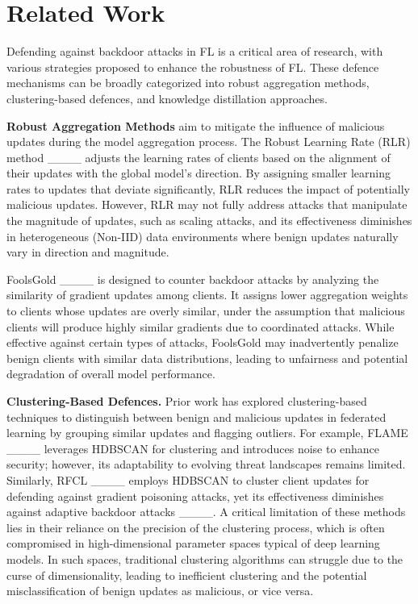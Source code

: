 \section{Related Work}
Defending against backdoor attacks in FL is a critical area of research, with various strategies proposed to enhance the robustness of FL. These defence mechanisms can be broadly categorized into robust aggregation methods, clustering-based defences, and knowledge distillation approaches.

\textbf{Robust Aggregation Methods} aim to mitigate the influence of malicious updates during the model aggregation process. The Robust Learning Rate (RLR) method ____ adjusts the learning rates of clients based on the alignment of their updates with the global model's direction. By assigning smaller learning rates to updates that deviate significantly, RLR reduces the impact of potentially malicious updates. However, RLR may not fully address attacks that manipulate the magnitude of updates, such as scaling attacks, and its effectiveness diminishes in heterogeneous (Non-IID) data environments where benign updates naturally vary in direction and magnitude. 

FoolsGold ____ is designed to counter backdoor attacks by analyzing the similarity of gradient updates among clients. It assigns lower aggregation weights to clients whose updates are overly similar, under the assumption that malicious clients will produce highly similar gradients due to coordinated attacks. While effective against certain types of attacks, FoolsGold may inadvertently penalize benign clients with similar data distributions, leading to unfairness and potential degradation of overall model performance.

\textbf{Clustering-Based Defences.} Prior work has explored clustering-based techniques to distinguish between benign and malicious updates in federated learning by grouping similar updates and flagging outliers. For example, FLAME ____ leverages HDBSCAN for clustering and introduces noise to enhance security; however, its adaptability to evolving threat landscapes remains limited. Similarly, RFCL ____ employs HDBSCAN to cluster client updates for defending against gradient poisoning attacks, yet its effectiveness diminishes against adaptive backdoor attacks ____. A critical limitation of these methods lies in their reliance on the precision of the clustering process, which is often compromised in high-dimensional parameter spaces typical of deep learning models. In such spaces, traditional clustering algorithms can struggle due to the curse of dimensionality, leading to inefficient clustering and the potential misclassification of benign updates as malicious, or vice versa.

